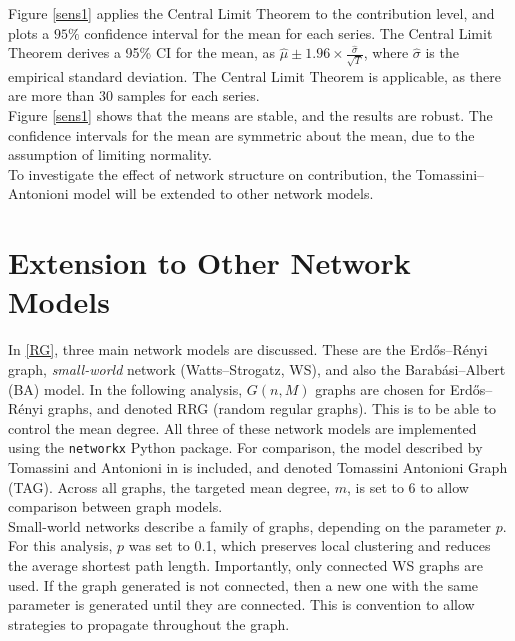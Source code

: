 Figure \ref{sens1} applies the Central Limit Theorem to the contribution level, and plots a $95\%$ confidence interval for the mean for each series. The Central Limit Theorem derives a 95\% CI for the mean, as $\hat{\mu} \pm 1.96\times\frac{\hat{\sigma}}{\sqrt{T}}$, where $\hat{\sigma}$ is the empirical standard deviation. The Central Limit Theorem is applicable, as there are more than 30 samples for each series. \\
\FloatBarrier
{}
\FloatBarrier
Figure \ref{sens1} shows that the means are stable, and the results are robust. The confidence intervals for the mean are symmetric about the mean, due to the assumption of limiting normality. \\

To investigate the effect of network structure on contribution, the Tomassini--Antonioni model will be extended to other network models.

\section{Extension to Other Network Models} \label{other_networks}

In \ref{RG}, three main network models are discussed. These are the Erd\H{o}s--R\'enyi graph, \emph{small-world} network (Watts--Strogatz, WS), and also the Barab\'{a}si--Albert (BA) model. In the following analysis, $G(n,M)$ graphs are chosen for Erd\H{o}s--R\'enyi graphs, and denoted RRG (random regular graphs). This is to be able to control the mean degree. All three of these network models are implemented using the \verb+networkx+ Python package. For comparison, the model described by Tomassini and Antonioni in \cite{RN51} is included, and denoted Tomassini Antonioni Graph (TAG). Across all graphs, the targeted mean degree, $m$, is set to 6 to allow comparison between graph models. \\

Small-world networks describe a family of graphs, depending on the parameter $p$. For this analysis, $p$ was set to 0.1, which preserves local clustering and reduces the average shortest path length. Importantly, only connected WS graphs are used. If the graph generated is not connected, then a new one with the same parameter is generated until they are connected. This is convention to allow strategies to propagate throughout the graph. \\

